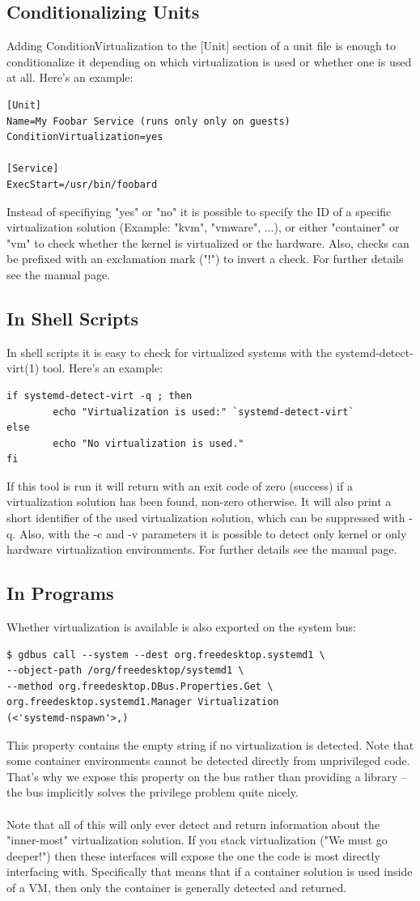 \documentclass[titlepage]{article}
\begin{document}
\subsection{Conditionalizing Units}
Adding ConditionVirtualization to the [Unit] section of a unit file is enough to conditionalize it depending on which virtualization is used or whether one is used at all. Here's an example:
\begin{lstlisting}
[Unit]
Name=My Foobar Service (runs only only on guests)
ConditionVirtualization=yes

[Service]
ExecStart=/usr/bin/foobard
\end{lstlisting}
Instead of specifiying "yes" or "no" it is possible to specify the ID of a specific virtualization solution (Example: "kvm", "vmware", ...), or either "container" or "vm" to check whether the kernel is virtualized or the hardware. Also, checks can be prefixed with an exclamation mark ("!") to invert a check. For further details see the manual page.
\subsection{In Shell Scripts}
In shell scripts it is easy to check for virtualized systems with the systemd-detect-virt(1) tool. Here's an example:
\begin{lstlisting}
if systemd-detect-virt -q ; then
        echo "Virtualization is used:" `systemd-detect-virt`
else
        echo "No virtualization is used."
fi
\end{lstlisting}
If this tool is run it will return with an exit code of zero (success) if a virtualization solution has been found, non-zero otherwise. It will also print a short identifier of the used virtualization solution, which can be suppressed with -q. Also, with the -c and -v parameters it is possible to detect only kernel or only hardware virtualization environments. For further details see the manual page.
\subsection{In Programs}
Whether virtualization is available is also exported on the system bus:
\begin{lstlisting}
$ gdbus call --system --dest org.freedesktop.systemd1 \
--object-path /org/freedesktop/systemd1 \ 
--method org.freedesktop.DBus.Properties.Get \ 
org.freedesktop.systemd1.Manager Virtualization
(<'systemd-nspawn'>,)
\end{lstlisting}
This property contains the empty string if no virtualization is detected. Note that some container environments cannot be detected directly from unprivileged code. That's why we expose this property on the bus rather than providing a library -- the bus implicitly solves the privilege problem quite nicely.
\\
\\
Note that all of this will only ever detect and return information about the "inner-most" virtualization solution. If you stack virtualization ("We must go deeper!") then these interfaces will expose the one the code is most directly interfacing with. Specifically that means that if a container solution is used inside of a VM, then only the container is generally detected and returned.
\end{document}
